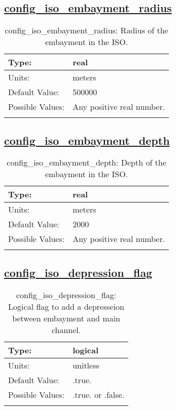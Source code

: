 \subsection[config\_iso\_embayment\_radius]{\hyperref[sec:nm_tab_iso]{config\_iso\_embayment\_radius}}
\label{subsec:nm_sec_config_iso_embayment_radius}
\begin{center}
\begin{longtable}{| p{2.0in} || p{4.0in} |}
    \hline
    Type: & real \\
    \hline
    Units: & \si{meters} \\
    \hline
    Default Value: & 500000 \\
    \hline
    Possible Values: & Any positive real number. \\
    \hline
    \caption{config\_iso\_embayment\_radius: Radius of the embayment in the ISO.}
\end{longtable}
\end{center}
\subsection[config\_iso\_embayment\_depth]{\hyperref[sec:nm_tab_iso]{config\_iso\_embayment\_depth}}
\label{subsec:nm_sec_config_iso_embayment_depth}
\begin{center}
\begin{longtable}{| p{2.0in} || p{4.0in} |}
    \hline
    Type: & real \\
    \hline
    Units: & \si{meters} \\
    \hline
    Default Value: & 2000 \\
    \hline
    Possible Values: & Any positive real number. \\
    \hline
    \caption{config\_iso\_embayment\_depth: Depth of the embayment in the ISO.}
\end{longtable}
\end{center}
\subsection[config\_iso\_depression\_flag]{\hyperref[sec:nm_tab_iso]{config\_iso\_depression\_flag}}
\label{subsec:nm_sec_config_iso_depression_flag}
\begin{center}
\begin{longtable}{| p{2.0in} || p{4.0in} |}
    \hline
    Type: & logical \\
    \hline
    Units: & \si{unitless} \\
    \hline
    Default Value: & .true. \\
    \hline
    Possible Values: & .true. or .false. \\
    \hline
    \caption{config\_iso\_depression\_flag: Logical flag to add a depresseion between embayment and main channel.}
\end{longtable}
\end{center}

